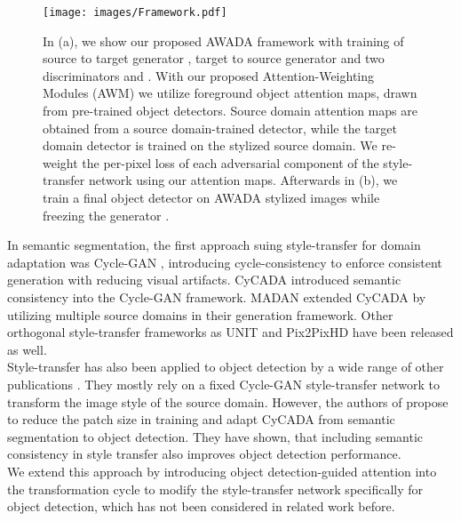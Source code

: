 \documentclass[10pt,twocolumn,letterpaper]{article}
\begin{document}
\begin{figure*}[t]
	\centering
	\texttt{[image: images/Framework.pdf]}
	\caption{In (a), we show our proposed AWADA framework with training of source to target generator , target to source generator  and two discriminators  and . With our proposed Attention-Weighting Modules (AWM) we utilize foreground object attention maps, drawn from pre-trained object detectors. Source domain attention maps are obtained from a source domain-trained detector, while the target domain detector is trained on the stylized source domain. We re-weight the per-pixel loss of each adversarial component of the style-transfer network using our attention maps. Afterwards in (b), we train a final object detector on AWADA stylized images while freezing the generator .}
	\label{fig:Framework}
\end{figure*}

In semantic segmentation, the first approach suing style-transfer for domain adaptation was Cycle-GAN \cite{CycleGAN}, introducing cycle-consistency to enforce consistent generation with reducing visual artifacts. CyCADA \cite{CyCADA} introduced semantic consistency into the Cycle-GAN framework. MADAN \cite{MADAN} extended CyCADA by utilizing multiple source domains in their generation framework. Other orthogonal style-transfer frameworks as UNIT \cite{UNIT} and Pix2PixHD \cite{pix2pixHD} have been released as well. \\
Style-transfer has also been applied to object detection by a wide range of other publications \cite{ProgressiveDomainAdaptation,UDA,Curriculum}. They mostly rely on a fixed Cycle-GAN style-transfer network to transform the image style of the source domain. However, the authors of \cite{menke2022} propose to reduce the patch size in training and adapt CyCADA from semantic segmentation to object detection. They have shown, that including semantic consistency in style transfer also improves object detection performance. \\
We extend this approach by introducing object detection-guided attention into the transformation cycle to modify the style-transfer network specifically for object detection, which has not been considered in related work before.
\end{document}
